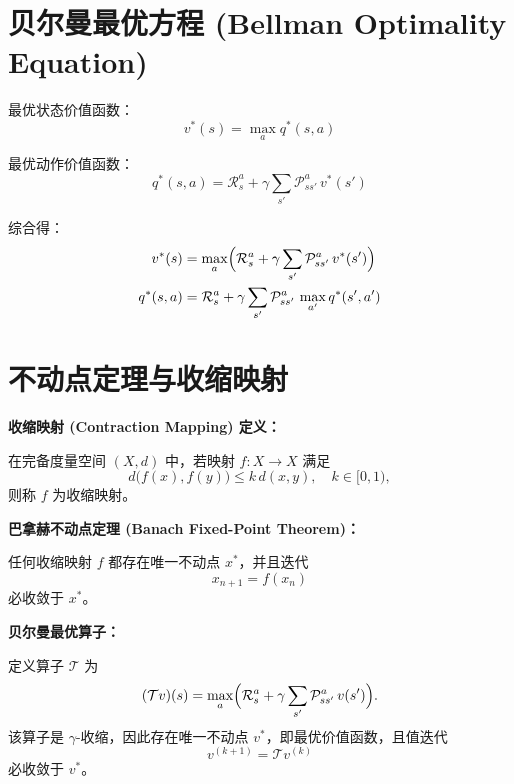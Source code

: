 \documentclass[a4paper]{article}
\begin{document}
\section{贝尔曼最优方程 (Bellman Optimality Equation)}

最优状态价值函数：
\begin{equation*}
v^*(s) = \max_a q^*(s, a)
\end{equation*}

最优动作价值函数：
\begin{equation*}
q^*(s, a) = \mathcal{R}_s^a + \gamma \sum_{s'} \mathcal{P}_{ss'}^a\,v^*(s')
\end{equation*}

综合得：
\begin{align*}
v^*(s) &= \max_a \Bigl(\mathcal{R}_s^a + \gamma \sum_{s'} \mathcal{P}_{ss'}^a\,v^*(s')\Bigr) \\
q^*(s, a) &= \mathcal{R}_s^a + \gamma \sum_{s'} \mathcal{P}_{ss'}^a\,\max_{a'} q^*(s', a')
\end{align*}

\hrulefill

\section{不动点定理与收缩映射}

\textbf{收缩映射 (Contraction Mapping) 定义：}

在完备度量空间 $(X,d)$ 中，若映射 $f:X\to X$ 满足
\begin{equation*}
d\bigl(f(x),f(y)\bigr)\le k\,d(x,y),\quad k\in[0,1),
\end{equation*}
则称 $f$ 为收缩映射。
\bigskip

\textbf{巴拿赫不动点定理 (Banach Fixed-Point Theorem)：}

任何收缩映射 $f$ 都存在唯一不动点 $x^*$，并且迭代
\begin{equation*}
x_{n+1}=f(x_n)
\end{equation*}
必收敛于 $x^*$。
\bigskip

\textbf{贝尔曼最优算子：}

定义算子 $\mathcal{T}$ 为
\begin{equation*}
(\mathcal{T}v)(s) = \max_a \Bigl(\mathcal{R}_s^a + \gamma \sum_{s'} \mathcal{P}_{ss'}^a\,v(s')\Bigr).
\end{equation*}
该算子是 $\gamma$-收缩，因此存在唯一不动点 $v^*$，即最优价值函数，且值迭代
\begin{equation*}
v^{(k+1)}=\mathcal{T}v^{(k)}
\end{equation*}
必收敛于 $v^*$。
\end{document}
